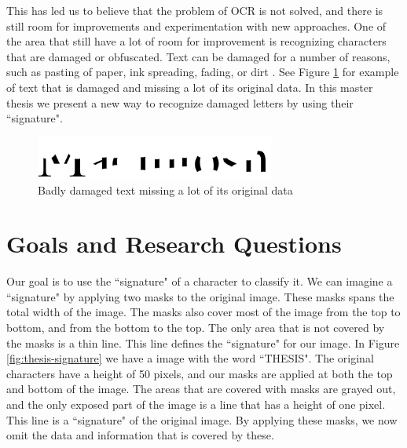 
This has led us to believe that the problem of OCR is not solved, and there is still room for improvements and experimentation with new approaches. One of the area that still have a lot of room for improvement is recognizing characters that are damaged or obfuscated. Text can be damaged for a number of reasons, such as pasting of paper, ink spreading, fading, or dirt \citep{bhardwaj2014imaging}. See Figure \ref{fig:damaged-text} for example of text that is damaged and missing a lot of its original data. In this master thesis we present a new way to recognize damaged letters by using their ``signature".

\begin{figure}[ht]
    \centering
    \includegraphics[width=0.7\textwidth]{fig/chapter1/damaged.png}
    \caption{Badly damaged text missing a lot of its original data}
    \label{fig:damaged-text}
\end{figure}


\section{Goals and Research Questions}
\label{sec:goals_and_research_questions}
Our goal is to use the ``signature" of a character to classify it. We can imagine a ``signature" by applying two masks to the original image. These masks spans the total width of the image. The masks also cover most of the image from the top to bottom, and from the bottom to the top. The only area that is not covered by the masks is a thin line. This line defines the ``signature" for our image. In Figure \ref{fig:thesis-signature} we have a image with the word ``THESIS". The original characters have a height of 50 pixels, and our masks are applied at both the top and bottom of the image. The areas that are covered with masks are grayed out, and the only exposed part of the image is a line that has a height of one pixel. This line is a ``signature" of the original image. By applying these masks, we now omit the data and information that is covered by these.

